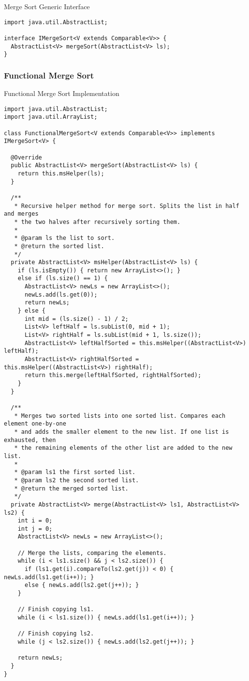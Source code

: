 \begin{cl}{Merge Sort Generic Interface}
\begin{lstlisting}[language=MyJava]
import java.util.AbstractList;

interface IMergeSort<V extends Comparable<V>> {
  AbstractList<V> mergeSort(AbstractList<V> ls);
}
\end{lstlisting}
\end{cl}

\subsubsection*{Functional Merge Sort}
\begin{cl}{Functional Merge Sort Implementation}
\begin{lstlisting}[language=MyJava]
import java.util.AbstractList;
import java.util.ArrayList;
  
class FunctionalMergeSort<V extends Comparable<V>> implements IMergeSort<V> {
  
  @Override
  public AbstractList<V> mergeSort(AbstractList<V> ls) {
    return this.msHelper(ls);
  }
  
  /**
   * Recursive helper method for merge sort. Splits the list in half and merges
   * the two halves after recursively sorting them.
   * 
   * @param ls the list to sort.
   * @return the sorted list.
   */
  private AbstractList<V> msHelper(AbstractList<V> ls) {
    if (ls.isEmpty()) { return new ArrayList<>(); }
    else if (ls.size() == 1) {
      AbstractList<V> newLs = new ArrayList<>();
      newLs.add(ls.get(0));
      return newLs;
    } else {
      int mid = (ls.size() - 1) / 2;
      List<V> leftHalf = ls.subList(0, mid + 1);
      List<V> rightHalf = ls.subList(mid + 1, ls.size());
      AbstractList<V> leftHalfSorted = this.msHelper((AbstractList<V>) leftHalf);
      AbstractList<V> rightHalfSorted = this.msHelper((AbstractList<V>) rightHalf);
      return this.merge(leftHalfSorted, rightHalfSorted);
    }
  }
  
  /**
   * Merges two sorted lists into one sorted list. Compares each element one-by-one
   * and adds the smaller element to the new list. If one list is exhausted, then
   * the remaining elements of the other list are added to the new list.
   *
   * @param ls1 the first sorted list.
   * @param ls2 the second sorted list.
   * @return the merged sorted list.
   */
  private AbstractList<V> merge(AbstractList<V> ls1, AbstractList<V> ls2) {
    int i = 0;
    int j = 0;
    AbstractList<V> newLs = new ArrayList<>();
          
    // Merge the lists, comparing the elements.
    while (i < ls1.size() && j < ls2.size()) {
      if (ls1.get(i).compareTo(ls2.get(j)) < 0) { newLs.add(ls1.get(i++)); }
      else { newLs.add(ls2.get(j++)); }
    }
  
    // Finish copying ls1.
    while (i < ls1.size()) { newLs.add(ls1.get(i++)); }
  
    // Finish copying ls2.
    while (j < ls2.size()) { newLs.add(ls2.get(j++)); }
  
    return newLs;
  }
}
\end{lstlisting}
\end{cl}

